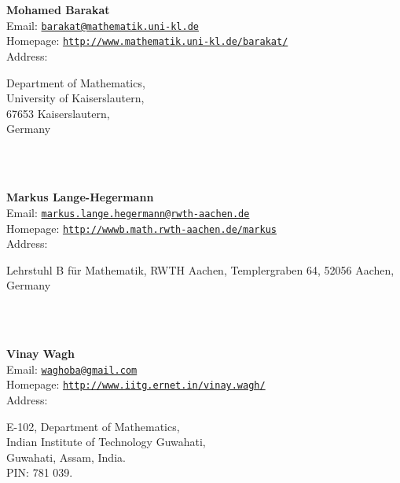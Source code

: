 \documentclass[a4paper,11pt]{report}
\begin{document}
\begin{titlepage}
\mbox{}\\
{\mbox{}\\
\small \noindent \textbf{Mohamed Barakat\\
    }  Email: \href{mailto://barakat@mathematik.uni-kl.de} {\texttt{barakat@mathematik.uni-kl.de}}\\
  Homepage: \href{http://www.mathematik.uni-kl.de/~barakat/} {\texttt{http://www.mathematik.uni-kl.de/\texttt{}barakat/}}\\
  Address: \begin{minipage}[t]{8cm}\noindent
 Department of Mathematics, \\
 University of Kaiserslautern, \\
 67653 Kaiserslautern, \\
 Germany \end{minipage}
}\\
{\mbox{}\\
\small \noindent \textbf{Markus Lange-Hegermann\\
    }  Email: \href{mailto://markus.lange.hegermann@rwth-aachen.de} {\texttt{markus.lange.hegermann@rwth-aachen.de}}\\
  Homepage: \href{http://wwwb.math.rwth-aachen.de/~markus} {\texttt{http://wwwb.math.rwth-aachen.de/\texttt{}markus}}\\
  Address: \begin{minipage}[t]{8cm}\noindent
 Lehrstuhl B f{\"u}r Mathematik, RWTH Aachen, Templergraben 64, 52056 Aachen,
Germany \end{minipage}
}\\
{\mbox{}\\
\small \noindent \textbf{Vinay Wagh\\
    }  Email: \href{mailto://waghoba@gmail.com} {\texttt{waghoba@gmail.com}}\\
  Homepage: \href{http://www.iitg.ernet.in/vinay.wagh/} {\texttt{http://www.iitg.ernet.in/vinay.wagh/}}\\
  Address: \begin{minipage}[t]{8cm}\noindent
 E-102, Department of Mathematics, \\
 Indian Institute of Technology Guwahati, \\
 Guwahati, Assam, India. \\
 PIN: 781 039. \end{minipage}
}\\
\end{titlepage}
\end{document}
